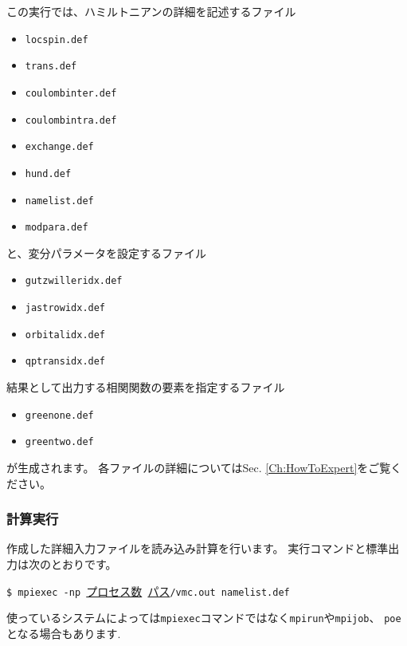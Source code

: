 この実行では、ハミルトニアンの詳細を記述するファイル
\begin{itemize}
\item \verb|locspin.def|
\item \verb|trans.def|
\item \verb|coulombinter.def|
\item \verb|coulombintra.def|
\item \verb|exchange.def|
\item \verb|hund.def|
\item \verb|namelist.def|
\item \verb|modpara.def|
\end{itemize}
と、変分パラメータを設定するファイル
\begin{itemize}
\item \verb|gutzwilleridx.def|
\item \verb|jastrowidx.def|
\item \verb|orbitalidx.def|
\item \verb|qptransidx.def|
\end{itemize}
結果として出力する相関関数の要素を指定するファイル
\begin{itemize}
\item \verb|greenone.def|
\item \verb|greentwo.def|
\end{itemize}
が生成されます。
各ファイルの詳細についてはSec. \ref{Ch:HowToExpert}をご覧ください。

\subsubsection{計算実行}
作成した詳細入力ファイルを読み込み計算を行います。
実行コマンドと標準出力は次のとおりです。

\vspace{1cm}\hspace{-0.7cm}
\verb|$ mpiexec -np |\underline{プロセス数}\verb| |\underline{パス}\verb|/vmc.out namelist.def|

使っているシステムによっては\verb|mpiexec|コマンドではなく\verb|mpirun|や\verb|mpijob|、
\verb|poe|となる場合もあります.

\small

